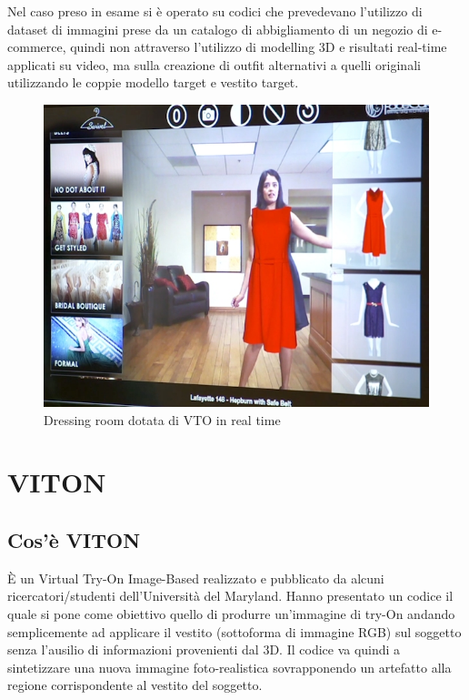 \documentclass[final, 11pt]{article}
\begin{document}
	Nel caso preso in esame si è operato su codici che prevedevano l'utilizzo di dataset di immagini prese da
un catalogo di abbigliamento di un negozio di e-commerce, quindi non attraverso l'utilizzo di modelling 3D e risultati real-time applicati su video, ma sulla creazione di outfit alternativi a quelli originali utilizzando le coppie modello target e vestito target.
	
	\begin{figure}[!htb]
		\begin{center}
			\includegraphics[scale=.7]{FaceCake-virtual-dressing-room.jpg}
		\end{center} \caption{Dressing room dotata di VTO in real time}
	\end{figure} 

	\section{VITON}
	\subsection{Cos'è VITON}
	È un Virtual Try-On Image-Based realizzato e pubblicato da alcuni ricercatori/studenti dell’Università del Maryland. Hanno presentato un codice il quale si pone come obiettivo quello di produrre un’immagine di try-On andando semplicemente ad applicare il vestito (sottoforma di immagine RGB) sul soggetto senza l’ausilio di informazioni provenienti dal 3D. Il codice va quindi a sintetizzare una nuova immagine foto-realistica sovrapponendo un artefatto alla regione corrispondente al vestito del soggetto. 
	
\end{document}

